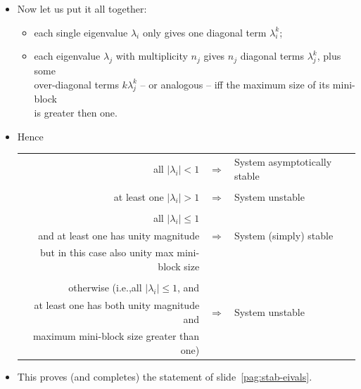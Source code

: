 \begin{frame}
\myPause
 \begin{itemize}[<+-| alert@+>]
 \item Now let us put it all together:
       \begin{itemize}[<+-| alert@+>]
       \item each single eigenvalue $\lambda_i$ only gives one diagonal term $\lambda_i^k$;
       \item each eigenvalue $\lambda_j$ with multiplicity $n_j$ gives $n_j$ diagonal terms $\lambda_j^k$, plus some\\
             \vspace{-0.75mm}over-diagonal terms $k\lambda_j^k$ -- or analogous -- iff the maximum size of its mini-block\\
             is greater then one.
       \end{itemize}
 \item Hence\\
       {\scriptsize 
        \begin{tabular}{rcl}
         all $|\lambda_i|<1$                             & $\Rightarrow$ & System asymptotically stable\\
         \\
         at least one $|\lambda_i|>1$                    & $\Rightarrow$ & System unstable\\
         \\
         all $|\lambda_i|\leq 1$                         & \\
         and at least one has unity magnitude            & $\Rightarrow$ & System (simply) stable\\
         but in this case also unity max mini-block size & \\
         \\
         otherwise (i.e.,all $|\lambda_i|\leq 1$, and    & \\
         at least one has both unity magnitude and       & $\Rightarrow$ & System unstable\\
         maximum mini-block size greater than one)       & \\
        \end{tabular}
       }
 \item \vfill This proves (and completes) the statement of slide~\ref{pag:stab-eivals}.
 \end{itemize}
\end{frame}

 

